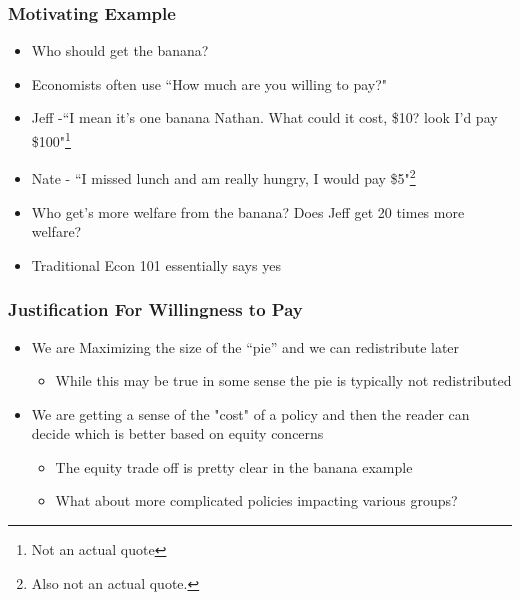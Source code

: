 \documentclass{beamer}
\begin{document}
\begin{frame}
\frametitle{Motivating Example}

\begin{itemize}
	\setlength{\itemsep}{5mm}
	\large
	\item Who should get the banana? 
	
	\item Economists often use ``How much are you willing to pay?" 
	
	\item Jeff -``I mean it’s one banana Nathan. What could it cost, \$10? look I'd pay \$100"\footnote[frame]{Not an actual quote} 
	
	\item Nate - ``I missed lunch and am really hungry, I would pay \$5"\footnote[frame]{Also not an actual quote.} 
	
	\item Who get's more welfare from the banana? Does Jeff get 20 times more welfare? 
	
	\item Traditional Econ 101 essentially says yes
\end{itemize}

\end{frame}



\begin{frame}
\frametitle{Justification For Willingness to Pay}

\begin{itemize}
	\setlength{\itemsep}{5mm}
	\large 
	\item We are Maximizing the size of the “pie” and we can redistribute later 
	\begin{itemize}
			\setlength{\itemsep}{5mm}
		\large
		\item While this may be true in some sense the pie is typically not redistributed
	\end{itemize}
	\item  We are getting a sense of the "cost" of a policy and then the reader can decide which is better based on equity concerns 
	\begin{itemize}
			\setlength{\itemsep}{5mm}
		\large
		\item The equity trade off is pretty clear in the banana example 
		\item What about more complicated policies impacting various groups? 
	\end{itemize}
\end{itemize}


\end{frame}
\end{document}
